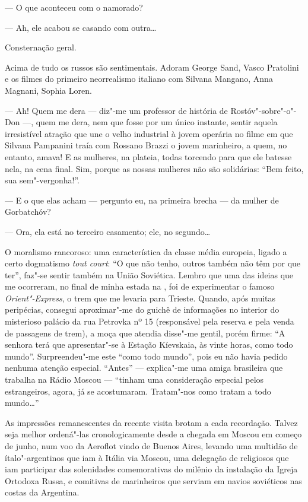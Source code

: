 --- O que aconteceu com o namorado?

--- Ah, ele acabou se casando com outra\ldots{}

Consternação geral.

Acima de tudo os russos são sentimentais. Adoram George Sand, Vasco Pratolini e os filmes do primeiro neorrealismo italiano com Silvana Mangano, Anna Magnani, Sophia Loren.

--- Ah! Quem me dera --- diz"-me um professor de história de Rostóv"-sobre"-o"-Don ---, quem me dera, nem que fosse por um único instante, sentir aquela irresistível atração que une o velho industrial à jovem operária no filme em que Silvana Pampanini traía com Rossano Brazzi o jovem marinheiro, a quem, no entanto, amava! E as mulheres, na plateia, todas torcendo para que ele batesse nela, na cena final. Sim, porque as nossas mulheres não são solidárias: ``Bem feito, sua sem"-vergonha!''.

--- E o que elas acham --- pergunto eu, na primeira brecha --- da mulher de Gorbatchóv?

--- Ora, ela está no terceiro casamento; ele, no segundo\ldots{}

O moralismo rancoroso: uma característica da classe média europeia, ligado a certo dogmatismo \emph{tout court}: ``O que não tenho, outros também não têm por que ter'', faz"-se sentir também na União Soviética. Lembro que uma das ideias que me ocorreram, no final de minha estada na , foi de experimentar o famoso \emph{Orient"-Express}, o trem que me levaria para Trieste. Quando, após muitas peripécias, consegui aproximar"-me do guichê de informações no interior do misterioso palácio
da rua Petrovka nº 15 (responsável pela reserva e pela venda de passagens de trem), a moça que atendia disse"-me gentil, porém firme: ``A senhora terá que apresentar"-se à Estação Kíevskaia, às vinte horas, como todo mundo''. Surpreendeu"-me este ``como todo mundo'', pois eu não havia pedido nenhuma atenção especial. ``Antes'' --- explica"-me uma amiga brasileira que trabalha na Rádio Moscou --- ``tinham uma consideração especial pelos estrangeiros, agora, já se acostumaram. Tratam"-nos como tratam a todo mundo\ldots{}''

As impressões remanescentes da recente visita brotam a cada recordação. Talvez seja melhor ordená"-las cronologicamente desde a chegada em Moscou em começo de junho, num voo da Aeroflot vindo de Buenos Aires, levando uma multidão de ítalo"-argentinos que iam à Itália via Moscou, uma delegação de religiosos que iam participar das solenidades comemorativas do milênio da instalação da Igreja Ortodoxa Russa, e comitivas de marinheiros que serviam em navios soviéticos nas costas da Argentina.

